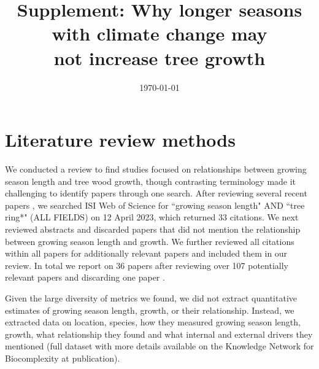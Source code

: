 \documentclass[11pt]{article}
\begin{document}
\renewcommand{\refname}{\CHead{}}


\title{Supplement: Why longer seasons with climate change may\\ not increase tree growth}
\date{\today}
\maketitle

\renewcommand{\thetable}{S\arabic{table}}
\renewcommand{\thefigure}{S\arabic{figure}}


\section*{Literature review methods}

We conducted a review to find studies focused on relationships between growing season length and tree wood growth, though contrasting terminology made it challenging to identify papers through one search. After reviewing several recent papers \citep{dow2022warm,zohner2023effect}, we searched ISI Web of Science for ``growing season length" AND ``tree ring*" (ALL FIELDS) on 12 April 2023, which returned 33 citations. We next reviewed abstracts and discarded papers that did not mention the relationship between growing season length and growth. We further reviewed all citations within all papers for additionally relevant papers and included them in our review. In total we report on 36 papers after reviewing over 107 potentially relevant papers and discarding one paper \citep[][which used tree rings as a metric of both growth and growing season length]{bruening2017}. %

Given the large diversity of metrics we found, we did not extract quantitative estimates of growing season length, growth, or their relationship. Instead, we extracted data on location, species, how they measured growing season length, growth, what relationship they found and what internal and external drivers they mentioned (full dataset with more details available on the Knowledge Network for Biocomplexity at publication).
\end{document}
